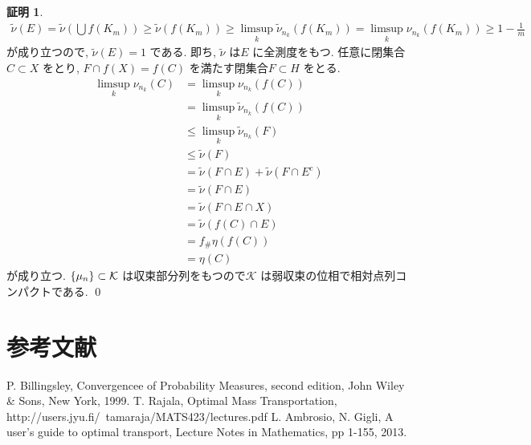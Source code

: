 \documentclass[10pt, fleqn, label-section=none, titlepage]{bxjsarticle}
\theoremstyle{definition}
\newtheorem*{pf*}{証明}
\newcommand{\cbra}[1]{\mleft\{#1\mright\}}
\newcommand{\push}{_{\#}}
\renewcommand{\;}{\, ; \,}
\begin{document}
\begin{pf*}
\begin{align*}
\tilde{\nu}(E) = \tilde{\nu}(\bigcup f(K_m)) \geq \tilde{\nu}(f(K_m)) 
\geq \limsup_k \tilde{\nu}_{n_k}(f(K_m)) = \limsup_k \nu_{n_k}(f(K_m)) \geq 1 - \frac{1}{m}
\end{align*}
が成り立つので, $\tilde \nu (E) = 1$ である. 即ち, $\tilde{\nu}$ は$E$ に全測度をもつ.
任意に閉集合$C\subset X$ をとり, $F\cap f(X) = f(C)$ を満たす閉集合$F \subset H$ をとる.
\begin{align*}
\limsup_k \nu_{n_k}(C) &= \limsup_k \nu_{n_k}(f(C)) \\
&= \limsup_k \tilde{\nu}_{n_k}(f(C)) \\
&\leq \limsup_k \tilde{\nu}_{n_k}(F) \\
&\leq \tilde{\nu}(F) \\
&= \tilde{\nu}(F \cap E) + \tilde{\nu}(F \cap E^c) \\
&= \tilde{\nu}(F \cap E) \\
&= \tilde{\nu}(F \cap E \cap X) \\
&= \tilde{\nu}(f(C) \cap E) \\
&= f\push \eta (f(C)) \\
&= \eta (C)
\end{align*}
が成り立つ. $\cbra{\mu_n}\subset \mathcal{K}$ は収束部分列をもつので$\mathcal{K}$ は弱収束の位相で相対点列コンパクトである.
\qed
\end{pf*}















\newpage
\setcounter{part}{0}
\part*{参考文献}



\begin{thebibliography}{99}
\bibitem{}  P. Billingsley, Convergencee of Probability Measures, second edition, John Wiley \& Sons, New York, 1999.
\bibitem{}  T. Rajala, Optimal Mass Transportation, http://users.jyu.fi/~tamaraja/MATS423/lectures.pdf
\bibitem{} L. Ambrosio, N. Gigli, A user's guide to optimal transport, Lecture Notes in Mathematics, pp 1-155, 2013.
\end{thebibliography}
\end{document}
